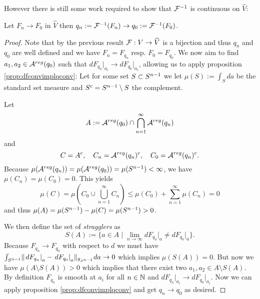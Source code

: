 However there is still some work required to show that $\mathcal{F}^{-1}$ is continuous on $\widehat{V}$:
\begin{lemma}\label{lem:frevcont} Let $F_n \to F_0$ in $\widehat{V}$ then $q_n:=\mathcal{F}^{-1}(F_n) \to q_0:=\mathcal{F}^{-1}(F_0)$.
\end{lemma}
\begin{proof}
    Note that by the previous result $\mathcal{F}:V\to \widehat{V}$ is a bijection and thus $q_n$ and $q_0$ are well defined and we have $F_n = F_{q_n}$ resp. $F_0 = F_{q_0}$. We now aim to find $a_1,a_2\in {{\mathcal{A}}^{reg}}(q_0)$ such that $dF_{q_n}\rvert_{a_i}\to dF_{q_0}\rvert_{a_i}$, allowing us to apply proposition \ref{prop:dfconvimplqconv}: Let for some set $S\subset {S^{n-1}}$ we let $\mu(S):= \int_{S}da$ be the standard set measure and $S^c = {S^{n-1}} \setminus S$ the complement.

    Let \[
        A:={{\mathcal{A}}^{reg}}(q_0) \cap \bigcap_{n=1}^{\infty}{{\mathcal{A}}^{reg}}(q_n)
    \] and
    \[
        C = A^c, \quad C_n = {{\mathcal{A}}^{reg}}(q_n)^c, \quad C_0 = {{\mathcal{A}}^{reg}}(q_n)^c.
    \]
    Because $\mu({{\mathcal{A}}^{reg}}(q_n))=\mu({{\mathcal{A}}^{reg}}(q_0))=\mu({S^{n-1}})<\infty$, we have $\mu(C_n)=\mu(C_0)=0$. This yields 
    \[
        \mu(C)= \mu\left(C_0 \cup \bigcup_{n=1}^{\infty}C_n\right) \leq \mu(C_0) + \sum_{n=1}^\infty \mu(C_n) = 0
    \] and thus $\mu(A)=\mu({S^{n-1}})-\mu(C)=\mu({S^{n-1}})>0$.

    We then define the set of \emph{stragglers} as 
    \[
        S(A):=\{a\in A \mid \lim_{n\to \infty} dF_{q_n}\rvert_a \neq dF_{q_0}\rvert_a\}.
    \] Because $F_{q_n}\to F_{q_0}$ with respect to $d$ we must have $\int_{{S^{n-1}}} \lVert \left.dF_{q_n}\right\rvert_a - \left.dF_{q_0}\right\rvert_a \rVert_{g_{S^{n-1}}}da \to 0$ which implies $\mu(S(A))=0$. But now we have $\mu(A\setminus S(A)) > 0$ which implies that there exist two $a_1,a_2\in A\setminus S(A)$. By definition $F_{q_n}$ is smooth at $a_i$ for all $n\in \mathbb{N}$ and $dF_{q_n}\rvert_{a_i} \to dF_{q_0}\rvert_{a_i}$. Now we can apply proposition \ref{prop:dfconvimplqconv} and get $q_n\to q_0$ as desired.
\end{proof}


